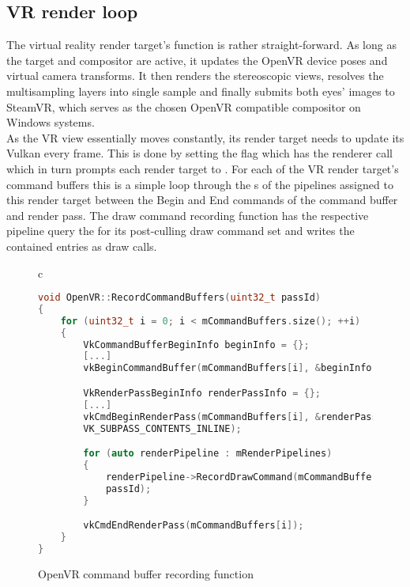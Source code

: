 \subsection{VR render loop}
The virtual reality render target's  function is rather straight-forward. 
As long as the target and compositor are active, it updates the OpenVR device poses and virtual camera transforms. It then renders the stereoscopic views, resolves the multisampling layers into single sample and finally submits both eyes' images to SteamVR, which serves as the chosen OpenVR compatible compositor on Windows systems. \\

As the VR view essentially moves constantly, its render target needs to update its Vulkan  every frame. This is done by setting the  flag which has the renderer call  which in turn prompts each render target to . For each of the VR render target's command buffers this is a simple loop through the s of the pipelines assigned to this render target between the Begin and End commands of the command buffer and render pass. The draw command recording function has the respective pipeline query the  for its post-culling draw command set and writes the contained entries as  draw calls. 

\begin{figure}[htb]
  \centering
  \begin{tabular}{c}
  \begin{lstlisting}[language=C++]
void OpenVR::RecordCommandBuffers(uint32_t passId)
{
	for (uint32_t i = 0; i < mCommandBuffers.size(); ++i)
	{
		VkCommandBufferBeginInfo beginInfo = {};
		[...]
		vkBeginCommandBuffer(mCommandBuffers[i], &beginInfo);

		VkRenderPassBeginInfo renderPassInfo = {};
		[...]
		vkCmdBeginRenderPass(mCommandBuffers[i], &renderPassInfo, 
		VK_SUBPASS_CONTENTS_INLINE);

		for (auto renderPipeline : mRenderPipelines)
		{
			renderPipeline->RecordDrawCommand(mCommandBuffers[i], 
			passId);
		}

		vkCmdEndRenderPass(mCommandBuffers[i]);
	}
}
	\end{lstlisting}
  \end{tabular}
  \caption[OpenVR render target's RecordCommandBuffers]{OpenVR command buffer recording function}\label{fig:lst_OpenVR_RecordCommandBuffers}
\end{figure}

